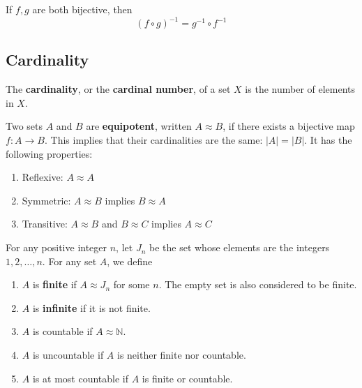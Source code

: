   \begin{theorem}
    If $f, g$ are both bijective, then 
    \begin{equation}
      (f \circ g)^{-1} = g^{-1} \circ f^{-1}
    \end{equation}
  \end{theorem}

\subsection{Cardinality}

  \begin{definition}[Cardinality]
    The \textbf{cardinality}, or the \textbf{cardinal number}, of a set $X$ is the number of elements in $X$. 
  \end{definition} 

  \begin{definition}[Equipotence]
    Two sets $A$ and $B$ are \textbf{equipotent}, written $A \approx B$, if there exists a bijective map $f: A \rightarrow B$. This implies that their cardinalities are the same: $|A| = |B|$. It has the following properties: 
    \begin{enumerate}
      \item Reflexive: $A \approx A$
      \item Symmetric: $A \approx B$ implies $B \approx A$
      \item Transitive: $A \approx B$ and $B \approx C$ implies $A \approx C$
    \end{enumerate}
  \end{definition}

  \begin{definition}
    For any positive integer $n$, let $J_n$ be the set whose elements are the integers $1, 2, \ldots, n$. For any set $A$, we define 
    \begin{enumerate}
      \item $A$ is \textbf{finite} if $A \approx J_n$ for some $n$. The empty set is also considered to be finite. 
      \item $A$ is \textbf{infinite} if it is not finite. 
      \item $A$ is countable if $A \approx \mathbb{N}$. 
      \item $A$ is uncountable if $A$ is neither finite nor countable. 
      \item $A$ is at most countable if $A$ is finite or countable. 
    \end{enumerate}
  \end{definition}

